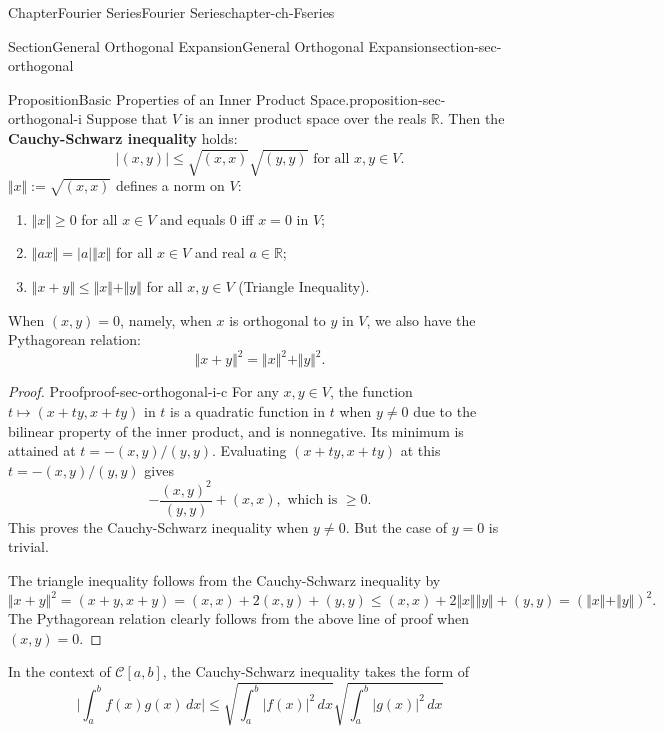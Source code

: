 \documentclass[oneside,10pt,]{book}
\newcommand{\terminology}[1]{\textbf{#1}}
\numberwithin{equation}{section}
\newcommand{\bbR}{\mathbb{R}}
\newcommand{\cC}{\mathcal{C}}
\begin{document}
\begin{chapterptx}{Chapter}{Fourier Series}{}{Fourier Series}{}{}{chapter-ch-Fseries}
\begin{sectionptx}{Section}{General Orthogonal Expansion}{}{General Orthogonal Expansion}{}{}{section-sec-orthogonal}
\begin{proposition}{Proposition}{Basic Properties of an Inner Product Space.}{}{proposition-sec-orthogonal-i}
Suppose that \(V\) is an inner product space over the reals \(\bbR\). Then the \terminology{Cauchy-Schwarz inequality} holds:%
\begin{equation*}
|(x, y)|\le \sqrt{(x, x)} \sqrt{(y, y)} \text{ for  all $x, y\in V$.}
\end{equation*}
\(\Vert x \Vert :=\sqrt{(x, x)}\) defines a norm on \(V\): %
\begin{enumerate}
\item{}\(\Vert x \Vert \ge 0\) for all \(x\in V\) and equals \(0\) iff \(x=0\) in \(V\);%
\item{}\(\Vert a x \Vert = |a| \Vert x \Vert\) for all \(x\in V\) and real \(a\in \bbR\);%
\item{}\(\Vert  x +y  \Vert\le  \Vert  x \Vert + \Vert y \Vert \) for all \(x, y\in V\) (Triangle Inequality).%
\end{enumerate}
 When \((x, y)=0\), namely, when \(x\) is orthogonal to \(y\) in \(V\), we also have  the Pythagorean relation:%
\begin{equation*}
\Vert x+y\Vert^{2} =\Vert x\Vert^{2} + \Vert y\Vert^{2}.
\end{equation*}
\end{proposition}
\begin{proof}{Proof}{}{proof-sec-orthogonal-i-c}
For any \(x, y\in V\), the function \(t\mapsto (x+t y, x+t y)\) in \(t\) is a quadratic function in \(t\) when \(y\ne 0\) due to  the bilinear property of the inner product, and is nonnegative. Its minimum is attained at \(t=- (x, y)/(y, y)\). Evaluating \((x+t y, x+t y)\) at this \(t=- (x, y)/(y, y)\) gives%
\begin{equation*}
- \frac{(x, y)^{2}}{(y, y)}+ (x, x), \text{ which is $\ge 0$.}
\end{equation*}
This proves the Cauchy-Schwarz inequality when \(y\ne 0\). But the case of \(y=0\) is trivial.%
\par
The triangle inequality follows from the Cauchy-Schwarz inequality by%
\begin{equation*}
\Vert  x +y  \Vert^{2}=(x+y, x+y)=(x, x)+2(x, y)+(y, y) \le (x, x)+2\Vert x \Vert  \Vert y \Vert  +(y, y)
=\left(\Vert x \Vert + \Vert y \Vert \right)^{2}.
\end{equation*}
The Pythagorean relation clearly follows from the above line of proof when \((x, y)=0\).%
\end{proof}
In the context of \(\cC[a, b]\), the Cauchy-Schwarz inequality takes the form of%
\begin{equation*}
\vert \int_{a}^{b} f(x) g(x)\, dx \vert \le \sqrt{ \int_{a}^{b} |f(x)|^{2}\, dx} \sqrt{ \int_{a}^{b} |g(x)|^{2}\, dx}

\end{equation*}
\end{sectionptx}
\end{chapterptx}
\end{document}

